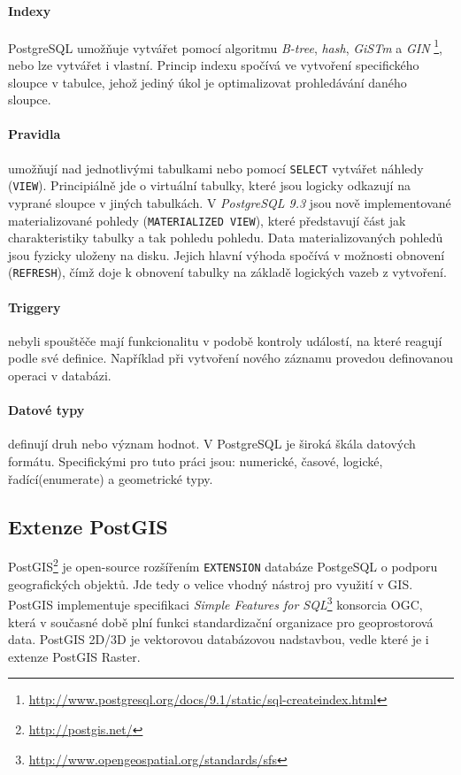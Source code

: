 \documentclass[a4paper,12pt]{report}
\begin{document}
\paragraph*{Indexy} PostgreSQL umožňuje vytvářet pomocí algoritmu \textit{B-tree}, \textit{hash}, \textit{GiSTm} a \textit{GIN} \footnote{\url{http://www.postgresql.org/docs/9.1/static/sql-createindex.html}}, nebo lze vytvářet i vlastní. Princip indexu spočívá ve vytvoření specifického sloupce v tabulce, jehož jediný úkol je optimalizovat prohledávání daného sloupce. 
\paragraph*{Pravidla} umožňují nad jednotlivými tabulkami nebo pomocí \texttt{SELECT} vytvářet náhledy (\texttt{VIEW}). Principiálně jde o virtuální tabulky, které jsou logicky odkazují na vyprané sloupce v jiných tabulkách. V \textit{PostgreSQL 9.3 } jsou nově implementované materializované pohledy (\texttt{MATERIALIZED VIEW}), které představují část jak charakteristiky tabulky a tak pohledu pohledu. Data materializovaných pohledů jsou fyzicky uloženy na disku. Jejich hlavní výhoda spočívá v možnosti obnovení (\texttt{REFRESH}), čímž doje k obnovení tabulky na základě logických vazeb z vytvoření.
\paragraph*{Triggery} nebyli spouštěče mají funkcionalitu v podobě kontroly událostí, na které reagují podle své definice. Například při vytvoření nového záznamu provedou definovanou operaci v databázi. 
\paragraph*{Datové typy} definují druh nebo význam hodnot. V PostgreSQL je široká škála datových formátu. Specifickými pro tuto práci jsou: numerické, časové, logické, řadící(enumerate) a geometrické typy.

\subsection{Extenze PostGIS}
PostGIS\footnote{\url{http://postgis.net/}} je open-source rozšířením \texttt{EXTENSION} databáze PostgeSQL o podporu geografických objektů. Jde tedy o velice vhodný   nástroj pro využití v GIS. PostGIS implementuje specifikaci \textit{Simple Features for SQL}\footnote{\url{http://www.opengeospatial.org/standards/sfs} } konsorcia \acs{OGC}, která v současné době plní funkci standardizační organizace pro geoprostorová data. PostGIS 2D/3D je vektorovou databázovou nadstavbou, vedle které je i extenze PostGIS Raster. 
\end{document}
